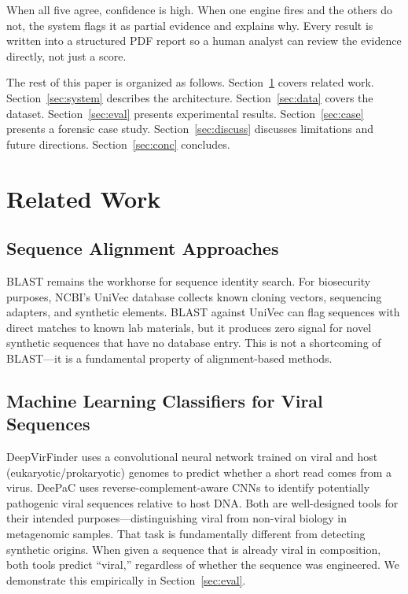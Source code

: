 \documentclass[conference]{IEEEtran}
\begin{document}
When all five agree, confidence is high. When one engine fires and the others do not, the system flags it as partial evidence and explains why. Every result is written into a structured PDF report so a human analyst can review the evidence directly, not just a score.

The rest of this paper is organized as follows. Section~\ref{sec:related} covers related work. Section~\ref{sec:system} describes the architecture. Section~\ref{sec:data} covers the dataset. Section~\ref{sec:eval} presents experimental results. Section~\ref{sec:case} presents a forensic case study. Section~\ref{sec:discuss} discusses limitations and future directions. Section~\ref{sec:conc} concludes.

\section{Related Work}
\label{sec:related}

\subsection{Sequence Alignment Approaches}

BLAST \cite{altschul1990} remains the workhorse for sequence identity search. For biosecurity purposes, NCBI's UniVec database \cite{univec} collects known cloning vectors, sequencing adapters, and synthetic elements. BLAST against UniVec can flag sequences with direct matches to known lab materials, but it produces zero signal for novel synthetic sequences that have no database entry. This is not a shortcoming of BLAST---it is a fundamental property of alignment-based methods.

\subsection{Machine Learning Classifiers for Viral Sequences}

DeepVirFinder \cite{ren2020} uses a convolutional neural network trained on viral and host (eukaryotic/prokaryotic) genomes to predict whether a short read comes from a virus. DeePaC \cite{bartoszewicz2020} uses reverse-complement-aware CNNs to identify potentially pathogenic viral sequences relative to host DNA. Both are well-designed tools for their intended purposes---distinguishing viral from non-viral biology in metagenomic samples. That task is fundamentally different from detecting synthetic origins. When given a sequence that is already viral in composition, both tools predict ``viral,'' regardless of whether the sequence was engineered. We demonstrate this empirically in Section~\ref{sec:eval}.
\end{document}
